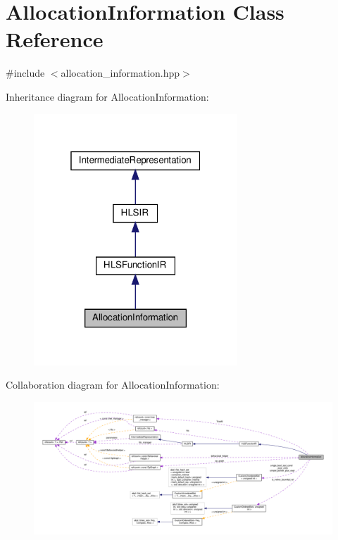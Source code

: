 \hypertarget{classAllocationInformation}{}\section{Allocation\+Information Class Reference}
\label{classAllocationInformation}


{\ttfamily \#include $<$allocation\+\_\+information.\+hpp$>$}



Inheritance diagram for Allocation\+Information\+:
\nopagebreak
\begin{figure}[H]
\begin{center}
\leavevmode
\includegraphics[width=217pt]{de/dbc/classAllocationInformation__inherit__graph}
\end{center}
\end{figure}


Collaboration diagram for Allocation\+Information\+:
\nopagebreak
\begin{figure}[H]
\begin{center}
\leavevmode
\includegraphics[width=350pt]{d4/d45/classAllocationInformation__coll__graph}
\end{center}
\end{figure}
